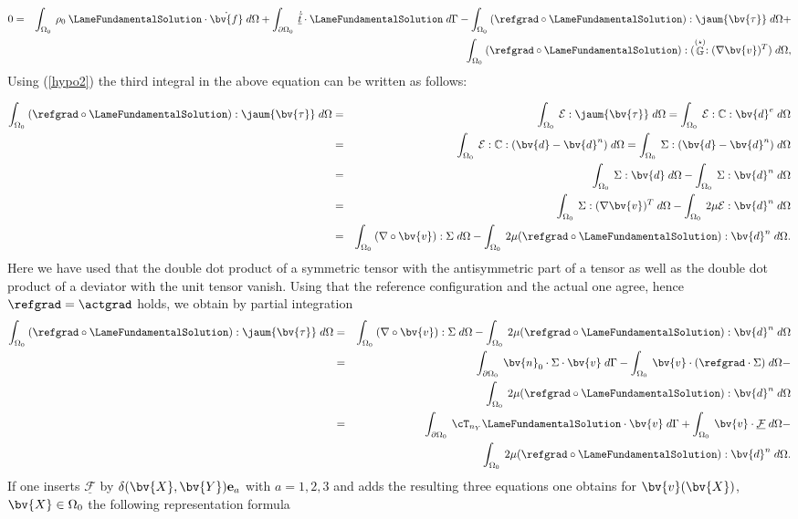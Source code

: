 \begin{eqnarray}
0&=&\int_{{\Omega_0}}\:\rho_{0}\:\LameFundamentalSolution\cdot\dot{\bv{f}}\;d\Omega+
\int_{\partial{\Omega_0}}\:\underline{\dot{\tilde{t}}}\cdot\LameFundamentalSolution\;d \Gamma-
\int_{{\Omega_0}}\:(\refgrad \circ\LameFundamentalSolution):\jaum{\bv{\tau}}\;d\Omega+\nonumber\\
&&\int_{{\Omega_0}}\:(\refgrad \circ\LameFundamentalSolution):(\stackrel{(\star)}{\mathbb{G}}:(\nabla \bv{v})^{T})\;d\Omega,\nonumber
\end{eqnarray}
Using (\ref{hypo2}) the third integral in the above equation can be written  as follows:

\begin{eqnarray}
\int_{{\Omega_0}}\:(\refgrad \circ\LameFundamentalSolution):\jaum{\bv{\tau}}\;d\Omega&=&\int_{{\Omega_0}}\:\mathcal{E}:\jaum{\bv{\tau}}\;d\Omega
=\int_{{\Omega_0}}\:\mathcal{E}:\mathbb{C}:\bv{d}^{e}\;d\Omega\nonumber\\
&=&\int_{{\Omega_0}}\:\mathcal{E}:\mathbb{C}:(\bv{d}-\bv{d}^{n})\;d\Omega
=\int_{{\Omega_0}}\:\Sigma:(\bv{d}-\bv{d}^{n})\;d\Omega\nonumber\\
&=&\int_{{\Omega_0}}\:\Sigma:\bv{d}\;d\Omega-\int_{{\Omega_0}}\:\Sigma:\bv{d}^{n}\;d\Omega\nonumber\\
&=&\int_{{\Omega_0}}\:\Sigma:(\nabla \bv{v})^{T}\;d\Omega-\int_{{\Omega_0}}\:2\mu\mathcal{E}:\bv{d}^{n}\;d\Omega\nonumber\\
&=&\int_{{\Omega_0}}\:(\nabla\circ\bv{v}):\Sigma\;d\Omega
-\int_{{\Omega_0}}\:2\mu(\refgrad \circ\LameFundamentalSolution):\bv{d}^{n}\;d\Omega.\nonumber
\end{eqnarray} 
Here we have used that the double dot product of a symmetric tensor with the antisymmetric part of a tensor as well as the double dot product of  a deviator with the unit tensor vanish. Using that the reference configuration and the actual one agree, hence $\refgrad =\actgrad$ holds, we obtain by partial integration 
\begin{eqnarray}
\int_{{\Omega_0}}\:(\refgrad \circ\LameFundamentalSolution):\jaum{\bv{\tau}}\;d\Omega&=&\int_{{\Omega_0}}\:(\nabla\circ\bv{v}):\Sigma\;d\Omega
-\int_{{\Omega_0}}\:2\mu(\refgrad \circ\LameFundamentalSolution):\bv{d}^{n}\;d\Omega\nonumber\\
&=&\int_{\partial{\Omega_0}}\:\bv{n}_{0}\cdot\Sigma\cdot\bv{v}\;d \Gamma
-\int_{{\Omega_0}}\:\bv{v}\cdot(\refgrad \cdot\Sigma)\;d\Omega-\nonumber\\
 &&\int_{{\Omega_0}}\:2\mu(\refgrad \circ\LameFundamentalSolution):\bv{d}^{n}\;d\Omega\nonumber\\
&=&\int_{\partial{\Omega_0}}\:\cT_{n_Y} \LameFundamentalSolution\cdot\bv{v}\;d \Gamma+
\int_{{\Omega_0}}\:\bv{v}\cdot\underline{\mathcal{F}}\;d\Omega-\nonumber\\
&&\int_{{\Omega_0}}\:2\mu(\refgrad \circ\LameFundamentalSolution):\bv{d}^{n}\;d\Omega.\nonumber
\end{eqnarray} 
If one inserts $\underline{\mathcal{F}}$ by $\delta(\bv{X},\bv{Y})\mathbf{e}_a$ with $a=1,2,3$ and adds the resulting three equations one obtains for $\bv{v}(\bv{X})$, $\bv{X}\in{\Omega_0}$ the following representation formula

